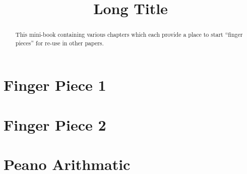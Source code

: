 \documentclass[a4paper,openany]{amsbook}
\begin{document}
\sloppy

\title[Short Title]{Long Title}

%

\begin{abstract}
This mini-book containing various chapters which each provide a place to start
``finger pieces'' for re-use in other papers.
\end{abstract} 
\maketitle 
\tableofcontents 

\chapter{Finger Piece 1}


\chapter{Finger Piece 2}


\chapter{Peano Arithmatic}


\printbibliography
\end{document}
